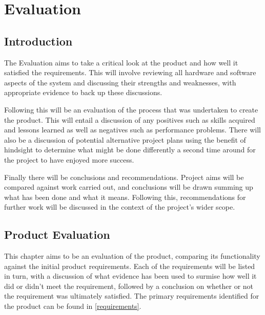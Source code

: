 \part{Evaluation}
	\chapter{Introduction}
	The Evaluation aims to take a critical look at the product and how well it satisfied the requirements. This will involve reviewing all hardware and software aspects of the system and discussing their strengths and weaknesses, with appropriate evidence to back up these discussions. 
	
	Following this will be an evaluation of the process that was undertaken to create the product. This will entail a discussion of any positives such as skills acquired and lessons learned as well as negatives such as performance problems. There will also be a discussion of potential alternative project plans using the benefit of hindsight to determine what might be done differently a second time around for the project to have enjoyed more success.
	
	Finally there will be conclusions and recommendations. Project aims will be compared against work carried out, and conclusions will be drawn summing up what has been done and what it means. Following this, recommendations for further work will be discussed in the context of the project's wider scope.
	
	\chapter{Product Evaluation}
	This chapter aims to be an evaluation of the product, comparing its functionality against the initial product requirements. Each of the requirements will be listed in turn, with a discussion of what evidence has been used to surmise how well it did or didn't meet the requirement, followed by a conclusion on whether or not the requirement was ultimately satisfied. The primary requirements identified for the product can be found in \ref{requirements}.
	
